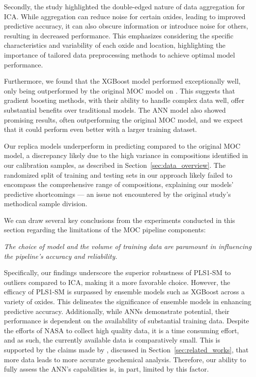 Secondly, the study highlighted the double-edged nature of data aggregation for ICA.
While aggregation can reduce noise for certain oxides, leading to improved predictive accuracy, it can also obscure information or introduce noise for others, resulting in decreased performance.
This emphasizes considering the specific characteristics and variability of each oxide and location, highlighting the importance of tailored data preprocessing methods to achieve optimal model performance.

Furthermore, we found that the XGBoost model performed exceptionally well, only being outperformed by the original MOC model on .
This suggests that gradient boosting methods, with their ability to handle complex data well, offer substantial benefits over traditional models.
The ANN model also showed promising results, often outperforming the original MOC model, and we expect that it could perform even better with a larger training dataset.

Our replica models underperform in predicting  compared to the original MOC model, a discrepancy likely due to the high variance in  compositions identified in our calibration samples, as described in Section~\ref{sec:data_overview}.
The randomized split of training and testing sets in our approach likely failed to encompass the comprehensive range of  compositions, explaining our models' predictive shortcomings --- an issue not encountered by the original study's methodical sample division.

We can draw several key conclusions from the experiments conducted in this section regarding the limitations of the MOC pipeline components:

\vspace{2mm}\noindent\textit{The choice of model and the volume of training data are paramount in influencing the pipeline's accuracy and reliability.}

\noindent
Specifically, our findings underscore the superior robustness of PLS1-SM to outliers compared to ICA, making it a more favorable choice.
However, the efficacy of PLS1-SM is surpassed by ensemble models such as XGBoost across a variety of oxides.
This delineates the significance of ensemble models in enhancing predictive accuracy.
Additionally, while ANNs demonstrate potential, their performance is dependent on the availability of substantial training data. 
Despite the efforts of NASA to collect high quality data, it is a time consuming effort, and as such, the currently available data is comparatively small.
This is supported by the claims made by \citet{lepore_quantitative_2022}, discussed in Section~\ref{sec:related_works}, that more data leads to more accurate geochemical analysis.
Therefore, our ability to fully assess the ANN's capabilities is, in part, limited by this factor.

